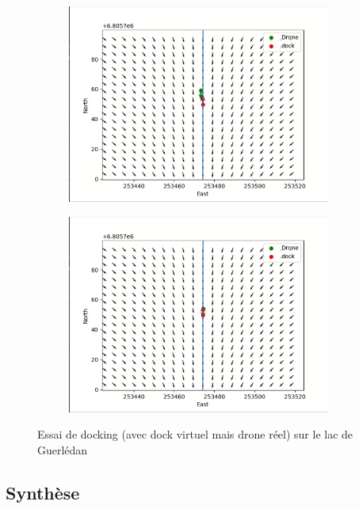 \documentclass[12pt]{report}
\begin{document}
\begin{figure}[H]
  \begin{subfigure}{0.45\textwidth}
    \centering
    \includegraphics[width=0.95\textwidth]{imgs/drone_exp1_5.png}
    \caption{}
  \end{subfigure}
  \begin{subfigure}{0.45\textwidth}
    \centering
    \includegraphics[width=0.95\textwidth]{imgs/drone_exp1_6.png}
    \caption{}
  \end{subfigure}

  \caption{Essai de docking (avec dock virtuel mais drone réel) sur le lac de Guerlédan}
\end{figure}

\subsection{Synthèse}
\end{document}
